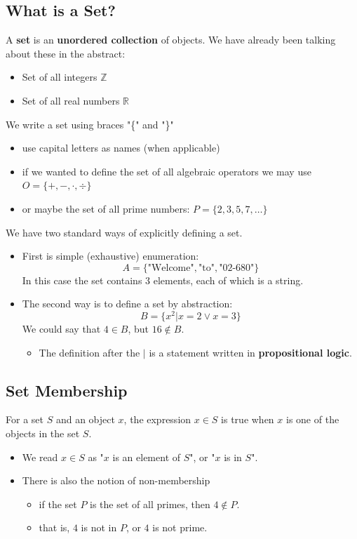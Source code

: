\documentclass[10pt]{article}
\begin{document}
\subsection*{What is a Set?}
A \textbf{set} is an \textbf{unordered collection} of objects.  We have already been talking about these in the abstract:
\begin{itemize}
	\item Set of all integers $\mathbb{Z}$
	\item Set of all real numbers $\mathbb{R}$
\end{itemize}
We write a set using braces "\{" and "\}"
\begin{itemize}
	\item use capital letters as names (when applicable)
	\item if we wanted to define the set of all algebraic operators we may use $O = \{+, -, \cdot, \div\}$
	\item or maybe the set of all prime numbers: $P = \{2, 3, 5, 7, \dots\}$
\end{itemize}
We have two standard ways of explicitly defining a set.
\begin{itemize}
	\item First is simple (exhaustive) enumeration:
	\[A = \{\text{"Welcome"}, \text{"to"}, \text{"02-680"}\}\]
    In this case the set contains 3 elements, each of which is a string.
    \item The second way is to define a set by abstraction:
    \[B = \{x^2 | x = 2 \lor x = 3\}\]
    We could say that $4 \in B$, but $16 \notin B$.
    \begin{itemize}
	    \item The definition after the $\vert$ is a statement written in \textbf{propositional logic}.
    \end{itemize}
\end{itemize}

\subsection*{Set Membership}
For a set $S$ and an object $x$, the expression $x \in S$ is true when $x$ is one of the objects in the set $S$.
\begin{itemize}
	\item We read $x \in S$ as "$x$ is an element of $S$", or "$x$ is in $S$".
	\item There is also the notion of non-membership
	\begin{itemize}
	    \item if the set $P$ is the set of all primes, then $4 \notin P$.
	    \item that is, $4$ is not in $P$, or $4$ is not prime.
    \end{itemize}
\end{itemize}
\end{document}
